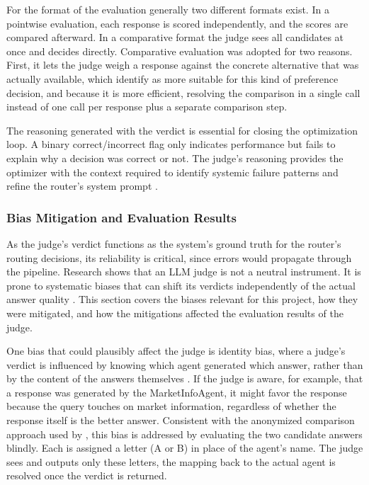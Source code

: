 For the format of the evaluation generally two different formats exist. In a pointwise evaluation, each response is scored independently, and the scores are compared afterward. In a comparative format the judge sees all candidates at once and decides directly. Comparative evaluation was adopted for two reasons. First, it lets the judge weigh a response against the concrete alternative that was actually available, which \textcite{zheng2023judging} identify as more suitable for this kind of preference decision, and because it is more efficient, resolving the comparison in a single call instead of one call per response plus a separate comparison step.

The reasoning generated with the verdict is essential for closing the optimization loop. A binary correct/incorrect flag only indicates performance but fails to explain why a decision was correct or not. The judge's reasoning provides the optimizer with the context required to identify systemic failure patterns and refine the router's system prompt \autocite{yang2023llmoptimizers}.

\subsubsection{Bias Mitigation and Evaluation Results}\label{sec:judge-bias}

As the judge's verdict functions as the system's ground truth for the router's routing decisions, its reliability is critical, since errors would propagate through the pipeline. Research shows that an LLM judge is not a neutral instrument. It is prone to systematic biases that can shift its verdicts independently of the actual answer quality \autocite{gu2024llmjudge}. This section covers the biases relevant for this project, how they were mitigated, and how the mitigations affected the evaluation results of the judge.

One bias that could plausibly affect the judge is identity bias, where a judge's verdict is influenced by knowing which agent generated which answer, rather than by the content of the answers themselves \autocite{koo2023biases}. If the judge is aware, for example, that a response was generated by the MarketInfoAgent, it might favor the response because the query touches on market information, regardless of whether the response itself is the better answer. Consistent with the anonymized comparison approach used by \textcite{koo2023biases}, this bias is addressed by evaluating the two candidate answers blindly. Each is assigned a letter (A or B) in place of the agent's name. The judge sees and outputs only these letters, the mapping back to the actual agent is resolved once the verdict is returned.

